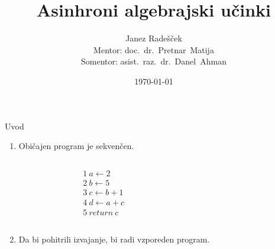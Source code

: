 \documentclass{beamer}
\theoremstyle{definition} %
\theoremstyle{plain} %
\begin{document}
	
	\title{Asinhroni algebrajski učinki}
	\author[Janez Radešček]{Janez Radešček \\[3mm] Mentor: doc.~dr.~Pretnar~Matija\\[3mm] Somentor: asist.~raz.~dr.~Danel~Ahman}
	\date{\today}
	
	\frame{\titlepage}
	
	
	
	
	\begin{frame}[fragile]{Uvod}
		\begin{enumerate}
			\item Običajen program je sekvenčen. 
			
			\begin{columns}[T]
				\begin{column}{0.2\textwidth}
					\begin{align*}
					&1\ a \gets 2  \\
					&2\ b \gets 5 \\
					&3\ c \gets b + 1 \\
					&4\ d \gets a + c \\
					&5\ return\ c 
					\end{align*}
					\vspace{0.1ex}
				\end{column}
				\begin{column}{0.5\textwidth}
				\end{column}
			\end{columns}
		
			\item Da bi pohitrili izvajanje, bi radi vzporeden program.

		\end{enumerate}	
	\end{frame}
\end{document}

